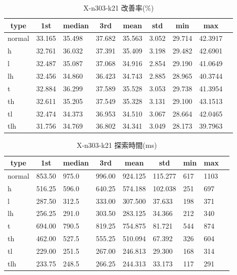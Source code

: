 \begin{table}[htbp]
    \caption{X-n303-k21 改善率(\%)}
    \begin{tabular}{|l|l|l|l|l|l|l|l|l|}\hline
    \multicolumn{1}{|c|}{\textbf{type}}
    &\multicolumn{1}{|c|}{\textbf{1st}}
    &\multicolumn{1}{c|}{\textbf{median}}
    &\multicolumn{1}{c|}{\textbf{3rd}}
    &\multicolumn{1}{c|}{\textbf{mean}}
    &\multicolumn{1}{c|}{\textbf{std}}
    &\multicolumn{1}{c|}{\textbf{min}}
    &\multicolumn{1}{c|}{\textbf{max}}\\\hline
	normal & 33.165 & 35.498 & 37.682 & 35.563 & 3.052 & 29.714 & 42.3917\\\hline
	h & 32.761 & 36.032 & 37.391 & 35.409 & 3.198 & 29.482 & 42.6901\\\hline
	l & 32.487 & 35.087 & 37.068 & 34.916 & 2.854 & 29.190 & 41.0649\\\hline
	lh & 32.456 & 34.860 & 36.423 & 34.743 & 2.885 & 28.965 & 40.3744\\\hline
	t & 32.884 & 36.299 & 37.589 & 35.528 & 3.053 & 29.738 & 41.3954\\\hline
	th & 32.611 & 35.205 & 37.549 & 35.328 & 3.131 & 29.100 & 43.1513\\\hline
	tl & 32.474 & 34.373 & 36.953 & 34.510 & 3.067 & 28.664 & 42.0465\\\hline
	tlh & 31.756 & 34.769 & 36.802 & 34.341 & 3.049 & 28.173 & 39.7963\\\hline
	\end{tabular}
\end{table}
\begin{table}[htbp]
    \caption{X-n303-k21 探索時間(ms)}
    \begin{tabular}{|l|l|l|l|l|l|l|l|l|}\hline
    \multicolumn{1}{|c|}{\textbf{type}}
    &\multicolumn{1}{|c|}{\textbf{1st}}
    &\multicolumn{1}{c|}{\textbf{median}}
    &\multicolumn{1}{c|}{\textbf{3rd}}
    &\multicolumn{1}{c|}{\textbf{mean}}
    &\multicolumn{1}{c|}{\textbf{std}}
    &\multicolumn{1}{c|}{\textbf{min}}
    &\multicolumn{1}{c|}{\textbf{max}}\\\hline
	normal & 853.50 & 975.0 & 996.00 & 924.125 & 115.277 & 617 & 1103\\\hline
	h & 516.25 & 596.0 & 640.25 & 574.188 & 102.038 & 251 & 697\\\hline
	l & 287.50 & 312.5 & 333.00 & 307.500 & 37.633 & 198 & 371\\\hline
	lh & 256.25 & 291.0 & 303.50 & 283.125 & 34.366 & 212 & 340\\\hline
	t & 694.00 & 790.5 & 819.25 & 754.875 & 81.721 & 544 & 874\\\hline
	th & 462.00 & 527.5 & 555.25 & 510.094 & 67.392 & 326 & 604\\\hline
	tl & 229.00 & 251.5 & 267.00 & 246.813 & 29.300 & 168 & 314\\\hline
	tlh & 233.75 & 248.5 & 266.25 & 244.313 & 33.173 & 117 & 291\\\hline
	\end{tabular}
\end{table}
